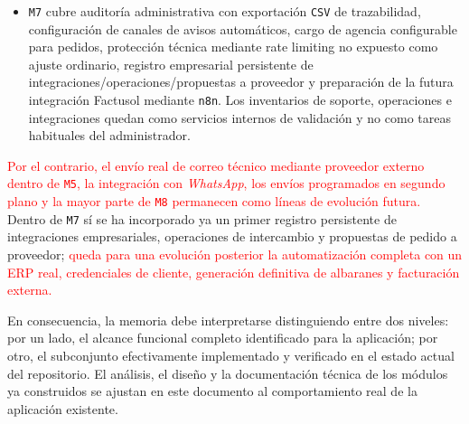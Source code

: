 \begin{itemize}
    \item \texttt{M7} cubre auditoría administrativa con exportación \texttt{CSV} de trazabilidad, configuración de canales de avisos automáticos, cargo de agencia configurable para pedidos, protección técnica mediante rate limiting no expuesto como ajuste ordinario, registro empresarial persistente de integraciones/operaciones/propuestas a proveedor y preparación de la futura integración Factusol mediante \texttt{n8n}. Los inventarios de soporte, operaciones e integraciones quedan como servicios internos de validación y no como tareas habituales del administrador.
\end{itemize}

\textcolor{red}{Por el contrario, el envío real de correo técnico mediante proveedor externo dentro de \texttt{M5}, la integración con \textit{WhatsApp}, los envíos programados en segundo plano y la mayor parte de \texttt{M8} permanecen como líneas de evolución futura.} Dentro de \texttt{M7} sí se ha incorporado ya un primer registro persistente de integraciones empresariales, operaciones de intercambio y propuestas de pedido a proveedor; \textcolor{red}{queda para una evolución posterior la automatización completa con un ERP real, credenciales de cliente, generación definitiva de albaranes y facturación externa.}

En consecuencia, la memoria debe interpretarse distinguiendo entre dos niveles: por un lado, el alcance funcional completo identificado para la aplicación; por otro, el subconjunto efectivamente implementado y verificado en el estado actual del repositorio. El análisis, el diseño y la documentación técnica de los módulos ya construidos se ajustan en este documento al comportamiento real de la aplicación existente.

